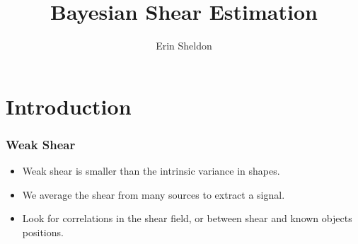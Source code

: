 \documentclass{beamer}
\title{Bayesian Shear Estimation}
\author{Erin Sheldon}
\institute{Brookhaven National Laboratory}
\begin{document}
\frame{\titlepage}

\section{Introduction}

\frame
{
    \frametitle{Weak Shear}

    \begin{itemize}

        \item Weak shear is smaller than the intrinsic variance in shapes.
            
        \item We average the shear from many sources to extract a signal.

        \item Look for correlations in the shear field, or between shear and
            known objects positions.


    \end{itemize}
}
\frame
\end{document}
